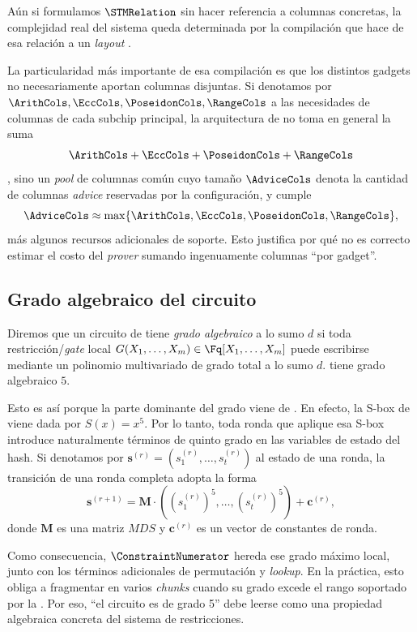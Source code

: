 Aún si formulamos $\STMRelation$ sin hacer referencia a columnas concretas, la complejidad real del sistema queda determinada por la compilación que hace \Midnight de esa relación a un \textit{layout} \HaloTwo.

La particularidad más importante de esa compilación es que los distintos gadgets no necesariamente aportan columnas disjuntas. Si denotamos por $\ArithCols, \EccCols, \PoseidonCols, \RangeCols$ a las necesidades de columnas de cada subchip principal, la arquitectura de \Midnight no toma en general la suma
$$\ArithCols+\EccCols+\PoseidonCols+\RangeCols$$,
sino un \textit{pool} de columnas común cuyo tamaño $\AdviceCols$ denota la cantidad de columnas \textit{advice} reservadas por la configuración, y cumple
$$\AdviceCols \approx \max\{\ArithCols, \EccCols, \PoseidonCols, \RangeCols \},$$
más algunos recursos adicionales de soporte. Esto justifica por qué no es correcto estimar el costo del \textit{prover} sumando ingenuamente columnas ``por gadget''.

\subsection{Grado algebraico del circuito}

Diremos que un circuito de \HaloTwo tiene \emph{grado algebraico} a lo sumo $d$ si toda restricción/\textit{gate} local $G(X_1, \ldots, X_m) \in \Fq[X_1, \ldots, X_m]$ puede escribirse mediante un polinomio multivariado de grado total a lo sumo $d$. \MidnightSTMCircuit tiene grado algebraico $5$.

Esto es así porque la parte dominante del grado viene de \MidnightPoseidonHash. En efecto, la S-box de \MidnightPoseidonHash viene dada por $S(x) = x^5$. Por lo tanto, toda ronda que aplique esa S-box introduce naturalmente términos de quinto grado en las variables de estado del hash. Si denotamos por $\mathbf{s}^{(r)} = (s^{(r)}_1, \ldots, s^{(r)}_t)$ al estado de una ronda, la transición de una ronda completa adopta la forma
$$\mathbf{s}^{(r+1)} = \mathbf{M} \cdot \left((s^{(r)}_1)^5, \ldots, (s^{(r)}_t)^5 \right) + \mathbf{c}^{(r)},$$
donde $\mathbf{M}$ es una matriz $MDS$ y $\mathbf{c}^{(r)}$ es un vector de constantes de ronda.

Como consecuencia, $\ConstraintNumerator$ hereda ese grado máximo local, junto con los términos adicionales de permutación y \textit{lookup}. En la práctica, esto obliga a fragmentar \QuotientPoly en varios \textit{chunks} cuando su grado excede el rango soportado por la \SRS. Por eso, ``el circuito \MidnightSTMCircuit es de grado 5'' debe leerse como una propiedad algebraica concreta del sistema de restricciones.

